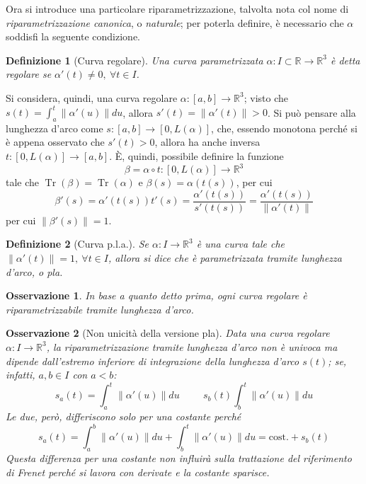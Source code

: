 \documentclass[12pt]{article}
\theoremstyle{style}
\newtheorem{definizione}{Definizione}[section]
\newtheorem{osservazione}{Osservazione}[section]
\numberwithin{equation}{subsection}
\begin{document}
\noindent Ora si introduce una particolare riparametrizzazione, talvolta nota col nome di \textit{riparametrizzazione canonica}, o \textit{naturale}; per poterla definire, \`e necessario che $\alpha $ soddisfi la seguente condizione.
\begin{definizione}
	[Curva regolare]
	Una curva parametrizzata $\alpha : I \subset \mathbb{R} \to \mathbb{R}^3$ \`e detta \textit{regolare} se $\alpha '(t) \neq 0, \ \forall t \in I$.
\end{definizione}
\noindent Si considera, quindi, una curva regolare $\alpha :[a,b] \to \mathbb{R}^3$; visto che $s(t) = \int_{a} ^t \left\lVert \alpha '(u) \right\rVert du$, allora $s'(t) = \left\lVert \alpha '(t) \right\rVert >0$.
Si pu\`o pensare alla lunghezza d'arco come $s : [a,b] \to [0, L(\alpha )]$, che, essendo monotona perch\'e si \`e appena osservato che $s'(t) > 0$, allora ha anche inversa $t : [0,L(\alpha )]\to [a,b]$.
\`E, quindi, possibile definire la funzione 
\begin{equation}
	\beta = \alpha \circ t : [0,L(\alpha )]\to \mathbb{R}^3
\end{equation}
tale che $\operatorname{Tr} (\beta )=\operatorname{Tr} (\alpha ) $ e $\beta (s) = \alpha (t(s))$, per cui
\[
\beta '(s) = \alpha '(t(s)) t'(s) = \frac{\alpha '(t(s))}{s'(t(s))} = \frac{\alpha '(t(s))}{\left\lVert \alpha '(t) \right\rVert }
\] 
per cui $\left\lVert \beta '(s) \right\rVert =1$.
\begin{definizione}
	[Curva p.l.a.]
	Se $\alpha :I\to\mathbb{R}^3$ \`e una curva tale che $\left\lVert \alpha '(t)\right\rVert = 1 , \ \forall t \in I$, allora si dice che \`e \textit{parametrizzata tramite lunghezza d'arco}, o pla.
\end{definizione}
\begin{osservazione}
In base a quanto detto prima, ogni curva regolare \`e \textit{riparametrizzabile tramite lunghezza d'arco}.
\end{osservazione}
\begin{osservazione}
	[Non unicit\`a della versione pla]
	Data una curva regolare $\alpha  : I \to \mathbb{R}^3$, la riparametrizzazione tramite lunghezza d'arco non \`e univoca ma dipende dall'estremo inferiore di integrazione della lunghezza d'arco $s(t)$; se, infatti, $a,b \in I$ con $a < b$:
	\[
	s_a (t) = \int_{a} ^t \left\lVert \alpha '(u) \right\rVert du \hspace{1cm}s_b (t) \int_{b} ^t \left\lVert \alpha '(u) \right\rVert du
	\] 
	Le due, per\`o, differiscono solo per una costante perch\'e
	\[
	s_a(t) = \int_{a} ^b \left\lVert \alpha '(u) \right\rVert du + \int_{b} ^t \left\lVert \alpha '(u) \right\rVert du = \text{cost.} + s_b(t)
	\] 
	Questa differenza per una costante non influir\`a sulla trattazione del riferimento di Frenet perch\'e si lavora con derivate e la costante sparisce.
\end{osservazione}
\end{document}
